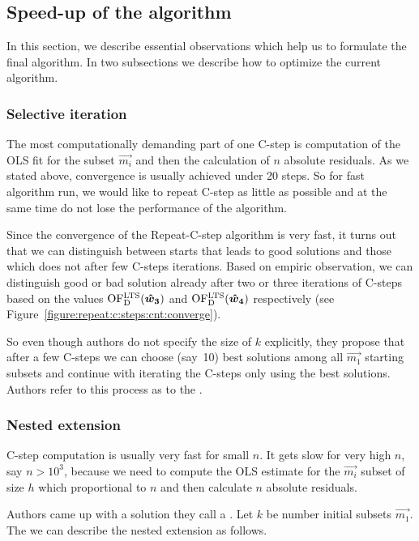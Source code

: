 
\subsection{Speed-up of the algorithm}
In this section, we describe essential observations which help us to formulate the final algorithm. In two subsections we describe how to optimize the current algorithm. 

\subsubsection*{Selective iteration}
The most computationally demanding part of one C-step is computation of the OLS fit for the subset $\vec{m_i}$ and then the calculation of $n$ absolute residuals. As we stated above, convergence is usually achieved under 20 steps. So for fast algorithm run, we would like to repeat C-step as little as possible and at the same time do not lose the performance of the algorithm. 

Since the convergence of the Repeat-C-step algorithm is very fast, it turns out that we can distinguish between starts that leads to good solutions and those which does not after few C-steps iterations. Based on empiric observation, we can distinguish good or bad solution already after two or three iterations of C-steps based on the values $\operatorname{OF^{LTS}_D}(\boldsymbol{\hat{w}_3})$ and $\operatorname{OF^{LTS}_D}(\boldsymbol{\hat{w}_4})$ respectively (see Figure~\ref{figure:repeat:c:steps:cnt:converge}). 

So even though authors do not specify the size of $k$ explicitly, they propose that after a few C-steps we can choose (say~10) best solutions among all $\vec{m_1}$ starting subsets and continue with iterating the C-steps only using the best solutions.
Authors refer to this process as to the .

\subsubsection*{Nested extension}
C-step computation is usually very fast for small $n$. It gets slow for very high $n$, say $n > 10^3$, because we need to compute the OLS estimate for the $\vec{m_i}$ subset of size $h$ which proportional to $n$ and then calculate $n$ absolute residuals.

Authors came up with a solution they call a . Let $k$ be number initial subsets $\vec{m_1}$. The we can describe the nested extension as follows.

